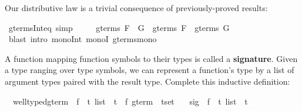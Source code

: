 \begin{isabellebody}
\begin{isamarkuptxt}
\smallskip
Our distributive law is a trivial consequence of previously-proved results:%
\end{isamarkuptxt}%
\isamarkuptrue%
%
\endisatagproof
{\isafoldproof}%
%
\isadelimproof
%
\endisadelimproof
{}\isamarkupfalse%
\ gterms{\isacharunderscore}Int{\isacharunderscore}eq\ {\isacharbrackleft}simp{\isacharbrackright}{\isacharcolon}\isanewline
\ \ \ \ \ {\isachardoublequoteopen}gterms\ {\isacharparenleft}F\ {\isasyminter}\ G{\isacharparenright}\ {\isacharequal}\ gterms\ F\ {\isasyminter}\ gterms\ G{\isachardoublequoteclose}\isanewline
%
\isadelimproof
%
\endisadelimproof
%
\isatagproof
{}\isamarkupfalse%
\ {\isacharparenleft}blast\ intro{\isacharbang}{\isacharcolon}\ mono{\isacharunderscore}Int\ monoI\ gterms{\isacharunderscore}mono{\isacharparenright}%
\endisatagproof
{\isafoldproof}%
%
\isadelimproof
%
\endisadelimproof
%
%


\begin{isamarkuptext}
\begin{exercise}
A function mapping function symbols to their 
types is called a \textbf{signature}.  Given a type 
ranging over type symbols, we can represent a function's type by a
list of argument types paired with the result type. 
Complete this inductive definition:
\begin{isabelle}
\isamarkupfalse%
\isanewline
\ \ well{\isacharunderscore}typed{\isacharunderscore}gterm\ {\isacharcolon}{\isacharcolon}\ {\isachardoublequoteopen}{\isacharparenleft}{\isacharprime}f\ {\isasymRightarrow}\ {\isacharprime}t\ list\ {\isacharasterisk}\ {\isacharprime}t{\isacharparenright}\ {\isasymRightarrow}\ {\isacharparenleft}{\isacharprime}f\ gterm\ {\isacharasterisk}\ {\isacharprime}t{\isacharparenright}set{\isachardoublequoteclose}\isanewline
\ \ \ sig\ {\isacharcolon}{\isacharcolon}\ {\isachardoublequoteopen}{\isacharprime}f\ {\isasymRightarrow}\ {\isacharprime}t\ list\ {\isacharasterisk}\ {\isacharprime}t{\isachardoublequoteclose}%
\end{isabelle}
\end{exercise}
\end{isamarkuptext}
%
\isadelimproof
%
\endisadelimproof
%
\isatagproof
%
\endisatagproof
{\isafoldproof}%
%
\isadelimproof
%
\endisadelimproof
%
\isadelimproof
%
\endisadelimproof
%
\isatagproof
%
\endisatagproof
{\isafoldproof}%
%
\isadelimproof
%
\endisadelimproof
%
\isadelimtheory
%
\endisadelimtheory
%
\isatagtheory
%
\endisatagtheory
{\isafoldtheory}%
%
\isadelimtheory
%
\endisadelimtheory
\end{isabellebody}%
